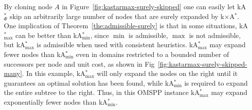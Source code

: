 \documentclass[smallextended]{svjour3}       %
\newcommand{\omspp}{\ac{OMSPP}\xspace}
\newcommand{\kastarvar}[1]{\textup{kA}$^*_{#1}$\xspace}
\newcommand{\kastarmin}{\kastarvar{\min}}
\newcommand{\kastarmax}{\kastarvar{\max}}
\newcommand{\kastarphi}{\textup{kA}$^*_{\Phi}$\xspace}
\newcommand{\kxastar}{k$\times$A$^*$\xspace}
\newcommand{\axiomadm}{admissible\xspace}
\begin{document}
By cloning node $A$ in Figure~\ref{fig:kastarmax-surely-skipped} one can easily let \kastarphi skip an arbitrarily large number of nodes that are surely expanded by \kxastar. 
One implication of Theorem~\ref{the:admissible-surely} is that in some situations, \kastarmax can be better than \kastarmin, since $\min$ is \axiomadm, $\max$ is not \axiomadm, but \kastarmax is admissible when used with consistent heuristics. 
\kastarmax may expand fewer nodes than \kastarmin even in domains restricted to a bounded number of successors per node and unit cost, as shown in Fig~\ref{fig:kastarmax-surely-skipped-many}.
In this example, \kastarmax will only expand the nodes on the right until it guarantees an optimal solution has been found, while \kastarmin is required to expand the entire subtree to the right. Thus, in this \omspp instance \kastarmax may expand exponentially fewer nodes than \kastarmin. 
\end{document}
